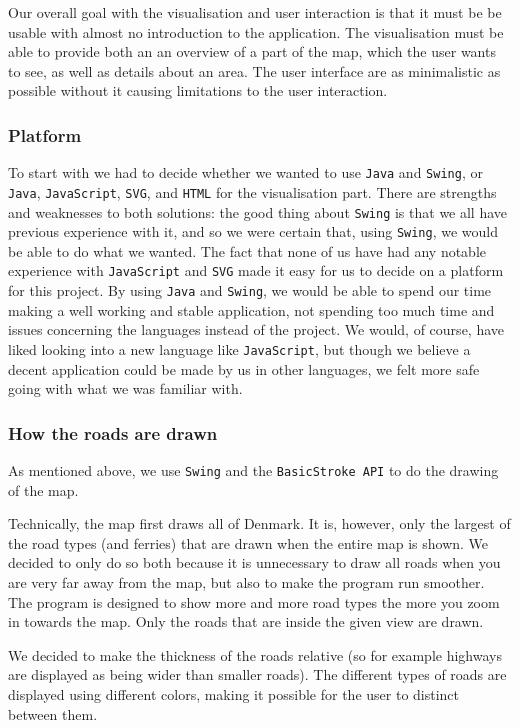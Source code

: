 Our overall goal with the visualisation and user interaction is that it must be be usable with almost no introduction to the application. The visualisation must be able to provide both an an overview of a part of the map, which the user wants to see, as well as details about an area. The user interface are as minimalistic as possible without it causing limitations to the user interaction.

\subsubsection{Platform}
To start with we had to decide whether we wanted to use \texttt{Java} and \texttt{Swing}, or \texttt{Java}, \texttt{JavaScript}, \texttt{SVG}, and \texttt{HTML} for the visualisation part. There are strengths and weaknesses to both solutions: the good thing about \texttt{Swing} is that we all have previous experience with it, and so we were certain that, using \texttt{Swing}, we would be able to do what we wanted. 
The fact that none of us have had any notable experience with \texttt{JavaScript} and \texttt{SVG} made it easy for us to decide on a platform for this project. By using \texttt{Java} and \texttt{Swing}, we would be able to spend our time making a well working and stable application, not spending too much time and issues concerning the languages instead of the project. We would, of course, have liked looking into a new language like \texttt{JavaScript}, but though we believe a decent application could be made by us in other languages, we felt more safe going with what we was familiar with.

\subsubsection{How the roads are drawn}
As mentioned above, we use \texttt{Swing} and the \texttt{BasicStroke API} to do the drawing of the map. 

Technically, the map first draws all of Denmark. It is, however, only the largest of the road types (and ferries) that are drawn when the entire map is shown. We decided to only do so both because it is unnecessary to draw all roads when you are very far away from the map, but also to make the program run smoother. The program is designed to show more and more road types the more you zoom in towards the map. Only the roads that are inside the given view are drawn.

We decided to make the thickness of the roads relative (so for example highways are displayed as being wider than smaller roads). The different types of roads are displayed using different colors, making it possible for the user to distinct between them.

